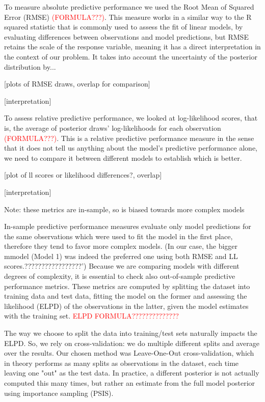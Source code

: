 \documentclass[12pt]{article}
\begin{document}
To measure absolute predictive performance we used the Root Mean of Squared Error (RMSE)
\textcolor{red}{(FORMULA???)}.
This measure works in a similar way to the R squared statistic that is commonly used to assess the fit of linear models, by evaluating differences between observations and model predictions, but RMSE retains the scale of the response variable, meaning it has a direct interpretation in the context of our problem.
It takes into account the uncertainty of the posterior distribution by...


[plots of RMSE draws, overlap for comparison]

[interpretation]



To assess relative predictive performance, we looked at log-likelihood scores, that is, the average of posterior draws' log-likelihoods for each observation
\textcolor{red}{(FORMULA???)}. 
This is a relative predictive performance measure in the sense that it does not tell us anything about the model's predictive performance alone, we need to compare it between different models to establish which is better.
 

[plot of ll scores or likelihood differences?, overlap]

[interpretation]

Note: these metrics are in-sample, so is biased towards more complex models 


In-sample predictive performance measures evaluate only model predictions for the same observations which were used to fit the model in the first place, therefore they tend to favor more complex models.
(In our case, the bigger mmodel (Model 1) was indeed the preferred one using both RMSE and LL scores.?????????????????')
Because we are comparing models with different degrees of complexity, it is essential to check also out-of-sample predictive performance metrics. These metrics are computed by splitting the dataset into training data and test data, fitting the model on the former and assessing the likelihood (ELPD) of the observations in the latter, given the model estimates with the training set.
\textcolor{red}{ELPD FORMULA??????????????}

The way we choose to split the data into training/test sets naturally impacts the ELPD. So, we rely on cross-validation: we do multiple different splits and average over the results. Our chosen method was Leave-One-Out cross-validation, which in theory performs as many splits as observations in the dataset, each time leaving one "out" as the test data. In practice, a different posterior is not actually computed this many times, but rather an estimate from the full model posterior using importance sampling (PSIS).
\end{document}
